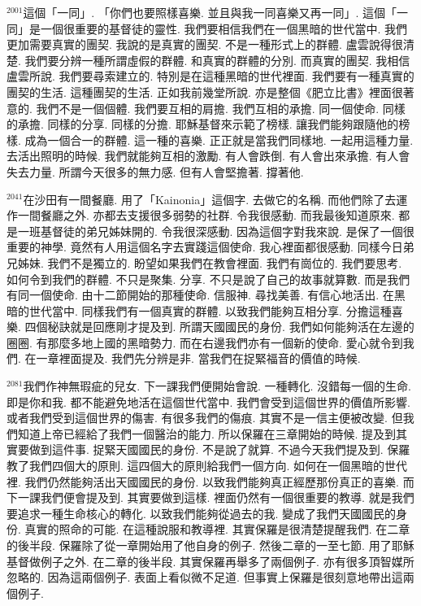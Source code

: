 \documentclass{book}
\begin{document}
$^{2001}$這個「一同」.
「你們也要照樣喜樂.
並且與我一同喜樂又再一同」.
這個「一同」是一個很重要的基督徒的靈性.
我們要相信我們在一個黑暗的世代當中.
我們更加需要真實的團契.
我說的是真實的團契.
不是一種形式上的群體.
盧雲說得很清楚.
我們要分辨一種所謂虛假的群體.
和真實的群體的分別.
而真實的團契.
我相信盧雲所說.
我們要尋索建立的.
特別是在這種黑暗的世代裡面.
我們要有一種真實的團契的生活.
這種團契的生活.
正如我前幾堂所說.
亦是整個《肥立比書》裡面很著意的.
我們不是一個個體.
我們要互相的肩擔.
我們互相的承擔.
同一個使命.
同樣的承擔.
同樣的分享.
同樣的分擔.
耶穌基督來示範了榜樣.
讓我們能夠跟隨他的榜樣.
成為一個合一的群體.
這一種的喜樂.
正正就是當我們同樣地.
一起用這種力量.
去活出照明的時候.
我們就能夠互相的激勵.
有人會跌倒.
有人會出來承擔.
有人會失去力量.
所謂今天很多的無力感.
但有人會堅擔著.
撐著他.

$^{2041}$在沙田有一間餐廳.
用了「Kainonia」這個字.
去做它的名稱.
而他們除了去運作一間餐廳之外.
亦都去支援很多弱勢的社群.
令我很感動.
而我最後知道原來.
都是一班基督徒的弟兄姊妹開的.
令我很深感動.
因為這個字對我來說.
是保了一個很重要的神學.
竟然有人用這個名字去實踐這個使命.
我心裡面都很感動.
同樣今日弟兄姊妹.
我們不是獨立的.
盼望如果我們在教會裡面.
我們有崗位的.
我們要思考.
如何令到我們的群體.
不只是聚集.
分享.
不只是說了自己的故事就算數.
而是我們有同一個使命.
由十二節開始的那種使命.
信服神.
尋找美善.
有信心地活出.
在黑暗的世代當中.
同樣我們有一個真實的群體.
以致我們能夠互相分享.
分擔這種喜樂.
四個秘訣就是回應剛才提及到.
所謂天國國民的身份.
我們如何能夠活在左邊的圈圈.
有那麼多地上國的黑暗勢力.
而在右邊我們亦有一個新的使命.
愛心就令到我們.
在一章裡面提及.
我們先分辨是非.
當我們在捉緊福音的價值的時候.

$^{2081}$我們作神無瑕疵的兒女.
下一課我們便開始會說.
一種轉化.
沒錯每一個的生命.
即是你和我.
都不能避免地活在這個世代當中.
我們會受到這個世界的價值所影響.
或者我們受到這個世界的傷害.
有很多我們的傷痕.
其實不是一信主便被改變.
但我們知道上帝已經給了我們一個醫治的能力.
所以保羅在三章開始的時候.
提及到其實要做到這件事.
捉緊天國國民的身份.
不是說了就算.
不過今天我們提及到.
保羅教了我們四個大的原則.
這四個大的原則給我們一個方向.
如何在一個黑暗的世代裡.
我們仍然能夠活出天國國民的身份.
以致我們能夠真正經歷那份真正的喜樂.
而下一課我們便會提及到.
其實要做到這樣.
裡面仍然有一個很重要的教導.
就是我們要追求一種生命核心的轉化.
以致我們能夠從過去的我.
變成了我們天國國民的身份.
真實的照命的可能.
在這種說服和教導裡.
其實保羅是很清楚提醒我們.
在二章的後半段.
保羅除了從一章開始用了他自身的例子.
然後二章的一至七節.
用了耶穌基督做例子之外.
在二章的後半段.
其實保羅再舉多了兩個例子.
亦有很多頂智媒所忽略的.
因為這兩個例子.
表面上看似微不足道.
但事實上保羅是很刻意地帶出這兩個例子.
\end{document}

